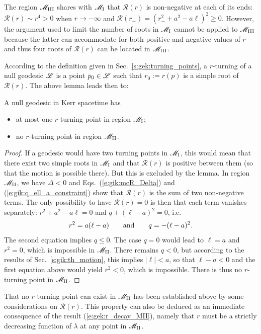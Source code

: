 \begin{remark} \label{r:gik:R_zero_M_III}
The region $\mathscr{M}_{\rm III}$ shares with $\mathscr{M}_{\rm I}$ that $\mathcal{R}(r)$ is
non-negative at each of its ends: $\mathcal{R}(r) \sim r^4 > 0$ when $r\to -\infty$
and $\mathcal{R}(r_-) = (r_-^2 + a^2 - a \ell)^2 \geq 0$. However, the argument
used to limit the number of roots in $\mathscr{M}_{\rm I}$
cannot be applied to $\mathscr{M}_{\rm III}$ because the latter can accommodate for both positive and negative
values of $r$ and thus four roots of $\mathcal{R}(r)$ can be located in $\mathscr{M}_{\rm III}$.
\end{remark}


According to the definition given in Sec.~\ref{s:gek:turning_points},
a $r$-turning of a null geodesic $\mathscr{L}$ is a point $p_0\in \mathscr{L}$
such that $r_0 := r(p)$ is a simple root of $\mathcal{R}(r)$.
The above lemma leads then to:
\begin{greybox}
A null geodesic in Kerr spacetime has
\begin{itemize}
\item at most one $r$-turning point in region $\mathscr{M}_{\rm I}$;
\item no $r$-turning point in region $\mathscr{M}_{\rm II}$.
\end{itemize}
\end{greybox}
\begin{proof}
If a geodesic would have two turning points in $\mathscr{M}_{\rm I}$, this would mean
that there exist two simple roots in $\mathscr{M}_{\rm I}$ and that
$\mathcal{R}(r)$ is positive between them (so that the motion is possible
there). But this is excluded by the lemma.
In region $\mathscr{M}_{\rm II}$, we have $\Delta < 0$ and
Eqs.~(\ref{e:gik:mcR_Delta}) and (\ref{e:gik:q_ell_a_constraint}) show that
$\mathcal{R}(r)$ is the sum of two non-negative terms. The only possibility
to have $\mathcal{R}(r)=0$ is then that each term vanishes separately:
$r^2 + a^2 - a\ell = 0$ and $q + (\ell -a)^2 = 0$, i.e.
\[
  r^2 = a (\ell - a) \qquad\mbox{and}\qquad q = - (\ell - a)^2 .
\]
The second equation implies $q\leq 0$. The case $q=0$ would lead to $\ell = a$ and $r^2 = 0$,
which is impossible in $\mathscr{M}_{\rm II}$. There remains $q < 0$, but
according to the results of Sec.~\ref{s:gik:th_motion}, this implies $|\ell| < a$, so
that $\ell - a < 0$ and the first equation above would yield $r^2 < 0$, which is impossible.
There is thus no $r$-turning point in $\mathscr{M}_{\rm II}$.
\end{proof}

\begin{remark}
That no $r$-turning point can exist in $\mathscr{M}_{\rm II}$ has been established
above by some considerations on $\mathcal{R}(r)$. This property can also be deduced as
an immediate consequence of the result (\ref{e:gek:r_decay_MII}), namely
that $r$ must be a strictly decreasing function of $\lambda$ at any point
in $\mathscr{M}_{\rm II}$.
\end{remark}

